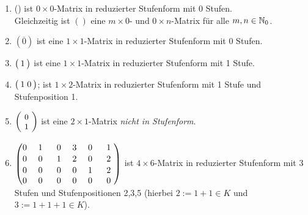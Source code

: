 \documentclass[../../main.tex]{subfiles}
\begin{document}
\begin{bsp}\label{5.1.11}
\begin{enumerate}[\normalfont(a)]
\item () ist $0\times 0$-Matrix in reduzierter Stufenform mit 0 Stufen.\\
Gleichzeitig ist $()$ eine $m\times 0$- und $0\times n$-Matrix für alle $m,n\in\mathbb N_0$.
\item  $(\overline{0})$ ist eine $1\times 1$-Matrix in reduzierter Stufenform mit 0 Stufen.
\item $\left(\tikz[baseline=(m1.base)]\node[inner sep=2](m1){1};\right)$ ist eine $1\times 1$-Matrix in reduzierter Stufenform mit 1 Stufe.
\item $\left(\tikz[baseline=(m1.base)]\node[inner sep=2](m1){$1\; 0$};\right)$; ist $1\times 2$-Matrix in reduzierter Stufenform mit 1 Stufe und Stufenposition 1.
\item $\cvec{\tikz[baseline=(m1.base)]\node[inner sep=2](m1){\small 0};\\\tikz[baseline=(m2.base)]\node[inner sep=2](m2){\small 1};}$ ist eine $2\times 1$-Matrix \emph{nicht in Stufenform}.
\item $\begin{pmatrix}
0 & \tikz[baseline=(m1.base)]\node(m1){1}; & 0 & 3 & 0 & 1\\
0 & 0 & \tikz[baseline=(m2.base)]\node(m2){1}; & 2 & 0 & 2\\
0 & 0 & 0 & 0 & \tikz[baseline=(m3.base)]\node(m3){1}; & \tikz[baseline=(m4.base)]\node(m4){2};\\
0 & 0 & 0 & 0 & 0 & 0
\end{pmatrix}$ ist $4\times 6$-Matrix in reduzierter Stufenform mit 3 Stufen und Stufenpositionen 2,3,5 (hierbei $2:=1+1\in K$ und $3:= 1+1+1\in K$).
\end{enumerate}
\end{bsp}
\end{document}
